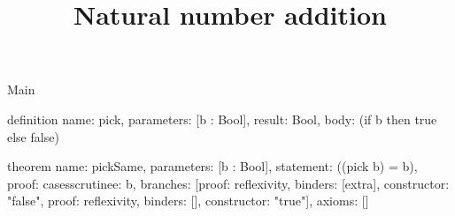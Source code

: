 \begin{lexlean}{Main}
\title{Natural number addition}
\begin{semanticmodule}
definition{
  name: pick,
  parameters: [b : Bool],
  result: Bool,
  body: (if b then true else false)
}

theorem{
  name: pickSame,
  parameters: [b : Bool],
  statement: ((pick b) = b),
  proof: cases{scrutinee: b, branches: [{proof: reflexivity{}, binders: [extra], constructor: "false"}, {proof: reflexivity{}, binders: [], constructor: "true"}]},
  axioms: []
}
\end{semanticmodule}
\end{lexlean}
